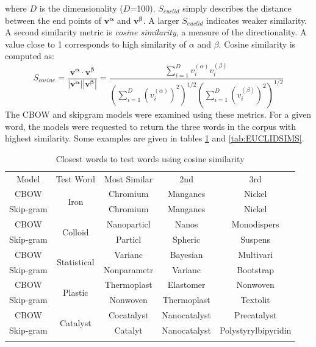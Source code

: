 where $D$ is the dimensionality ($D$=100). $S_{euclid}$ simply describes the distance between the end points of $\mathbf{v^\alpha}$ and $\mathbf{v^\beta}$. A larger $S_{euclid}$ indicates weaker similarity. A second similarity metric is \emph{cosine similarity}, a measure of the directionality. A value close to 1 corresponds to high similarity of $\alpha$ and $\beta$. Cosine similarity is computed as:
$$S_{cosine}=\frac{\mathbf{v^\alpha} \cdot \mathbf{v^\beta}}{|\mathbf{v^\alpha}| |\mathbf{v^\beta}|} = \frac{\displaystyle\sum_{i=1}^{D} v^{(\alpha)}_{i}v^{(\beta)}_{i}}{\left(\displaystyle\sum_{i=1}^{D} (v^{(\alpha)}_{i})^2\right)^{1/2} \left(\displaystyle\sum_{i=1}^{D} (v^{(\beta)}_{i})^2\right)^{1/2}}
$$
The CBOW and skipgram models were examined using these metrics. For a given word, the models were requested to return the three words in the corpus with highest similarity. Some examples are given in tables \ref{tab:COSINESIMS} and \ref{tab:EUCLIDSIMS}.
\begin{table}[H]
\begin{center}
\caption[Word similarity examinations with cosine similarity]{Closest words to test words using cosine similarity}
\label{tab:COSINESIMS}
\begin{tabular}{||c||c|c|c|c||}
\hline
Model     & Test Word              & Most Similar & 2nd & 3rd \\ \hhline{||=||=|=|=|=||}
CBOW      & \multirow{2}{*}{Iron} & Chromium             &  Manganes   &   Nickel  \\ \cline{1-1} \cline{3-5} 
Skip-gram &                   &  Chromium            &   Manganes  &  Nickel   \\ 
\hhline{||=||=|=|=|=||}
CBOW      & \multirow{2}{*}{Colloid} & Nanoparticl             &  Nanos   &   Monodispers  \\ \cline{1-1} \cline{3-5} 
Skip-gram &                   &  Particl            &   Spheric  &  Suspens   \\ 
\hhline{||=||=|=|=|=||}
CBOW      & \multirow{2}{*}{Statistical} & Varianc             &  Bayesian   &   Multivari  \\ \cline{1-1} \cline{3-5} 
Skip-gram &                   &  Nonparametr            &   Varianc  &  Bootstrap   \\ 
\hhline{||=||=|=|=|=||}
CBOW      & \multirow{2}{*}{Plastic} & Thermoplast             &  Elastomer   & Nonwoven    \\ \cline{1-1} \cline{3-5} 
Skip-gram &                   &  Nonwoven            &   Thermoplast  &  Textolit   \\ 
\hhline{||=||=|=|=|=||}
CBOW      & \multirow{2}{*}{Catalyst} & Cocatalyst             &  Nanocatalyst   & Precatalyst    \\ \cline{1-1} \cline{3-5} 
Skip-gram &                   &  Catalyt            &   Nanocatalyst  &  Polystyrylbipyridin   \\ 
\hhline{||=||=|=|=|=||}
\end{tabular}
\end{center}
\end{table}

